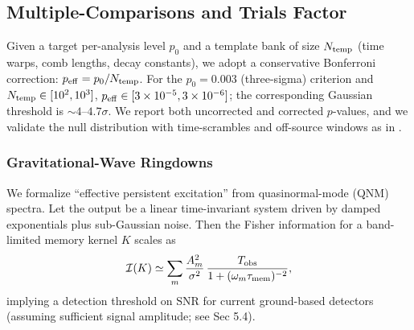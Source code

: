 \documentclass[aps,prd,preprint,onecolumn,superscriptaddress,nofootinbib,longbibliography,floatfix,11pt,showpacs,showkeys]{revtex4-2}
\theoremstyle{plain}
\theoremstyle{definition}
\theoremstyle{remark}
\begin{document}
\subsection{Multiple-Comparisons and Trials Factor}
\label{subsec:trials}
Given a target per-analysis level $p_0$ and a template bank of size $N_{\rm temp}$ (time warps, comb lengths, decay constants), we adopt a conservative Bonferroni correction: $p_{\rm eff}=p_0/N_{\rm temp}$. For the $p_0=0.003$ (three-sigma) criterion and $N_{\rm temp}\in[10^2,10^3]$, $p_{\rm eff}\in[3\times 10^{-5},3\times 10^{-6}]$; the corresponding Gaussian threshold is $\sim 4$--$4.7\sigma$. We report both uncorrected and corrected $p$-values, and we validate the null distribution with time-scrambles and off-source windows as in .


\subsubsection{Gravitational-Wave Ringdowns}
We formalize ``effective persistent excitation'' from quasinormal-mode (QNM) spectra. Let the output be a linear time-invariant system driven by damped exponentials plus sub-Gaussian noise. Then the Fisher information for a band-limited memory kernel $K$ scales as
\begin{align}
\mathcal{I}(K) \simeq \sum_{m} \frac{A_m^2}{\sigma^2}\,\frac{T_{\mathrm{obs}}}{1+(\omega_m\tau_{\rm mem})^{-2}},
\end{align}
implying a detection threshold on $\mathrm{SNR}$ for current ground-based detectors (assuming sufficient signal amplitude; see Sec 5.4).
\end{document}
